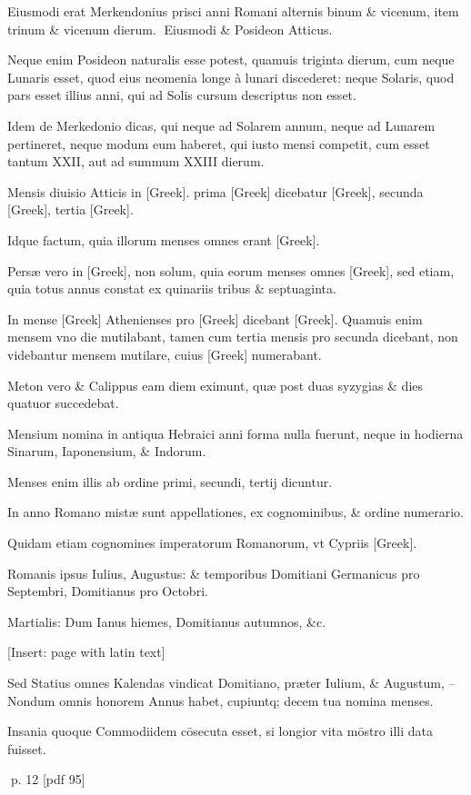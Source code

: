 \begin{parnumbers}

Eiusmodi erat Merkendonius  prisci anni Romani alternis binum \& vicenum, item trinum \& vicenum dierum.
Eiusmodi \& Posideon Atticus.

Neque enim Posideon naturalis esse potest, quamuis triginta dierum, cum neque Lunaris esset, quod eius neomenia longe à lunari discederet: neque Solaris, quod pars esset illius anni, qui ad Solis cursum descriptus non esset.

Idem de Merkedonio dicas, qui neque ad Solarem annum, neque ad Lunarem pertineret, neque modum eum haberet, qui iusto mensi competit, cum esset tantum XXII, aut ad summum XXIII dierum.

Mensis diuisio Atticis in \textgreek{[Greek]}. prima \textgreek{[Greek]} dicebatur \textgreek{[Greek]}, secunda \textgreek{[Greek]}, tertia \textgreek{[Greek]}.

Idque factum, quia illorum menses omnes erant \textgreek{[Greek]}.

Persæ vero in \textgreek{[Greek]},  non solum, quia eorum menses omnes \textgreek{[Greek]}, sed etiam, quia totus annus constat ex quinariis tribus \& septuaginta.

In mense \textgreek{[Greek]} Athenienses pro \textgreek{[Greek]} dicebant \textgreek{[Greek]}. Quamuis enim mensem vno die mutilabant, tamen cum tertia mensis pro secunda dicebant, non videbantur mensem mutilare, cuius \textgreek{[Greek]} numerabant.

Meton vero \& Calippus eam diem eximunt, quæ post duas syzygias \& dies quatuor succedebat.

Mensium nomina in antiqua Hebraici anni forma nulla fuerunt, neque in hodierna Sinarum, Iaponensium, \& Indorum.

Menses enim illis ab ordine primi, secundi, tertij dicuntur.

In anno Romano mistæ sunt appellationes, ex cognominibus, \& ordine numerario.

Quidam etiam cognomines imperatorum Romanorum, vt Cypriis \textgreek{[Greek]}.

Romanis ipsus Iulius, Augustus: \& temporibus Domitiani Germanicus pro Septembri, Domitianus pro Octobri.

Martialis: Dum Ianus hiemes, Domitianus autumnos, \&c.

[Insert: page with latin text]

Sed Statius omnes Kalendas vindicat Domitiano, præter Iulium, \& Augustum, – Nondum omnis honorem Annus habet, cupiuntq; decem tua nomina menses.

Insania quoque Commodiidem cōsecuta esset, si  longior vita mōstro illi data fuisset.

\end{parnumbers}
\clearpage
p. 12 [pdf 95]

